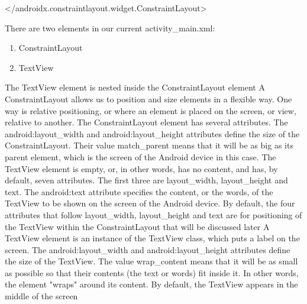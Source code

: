 \documentclass{report}
\begin{document}
\begin{itemize}
\begin{xmlcode}
                </androidx.constraintlayout.widget.ConstraintLayout>
            \end{xmlcode}
            \bigbreak \noindent 
            There are two elements in our current activity\_main.xml:
            \begin{enumerate}
                \item ConstraintLayout
                \item TextView
            \end{enumerate}
            \bigbreak \noindent 
            The TextView element is nested inside the ConstraintLayout element
            \bigbreak \noindent 
            A ConstraintLayout allows us to position and size elements in a flexible way.
            \bigbreak \noindent 
            One way is relative positioning, or where an element is placed on the screen, or view, relative to another. 
            \bigbreak \noindent 
            The ConstraintLayout element has several attributes.
            \bigbreak \noindent 
            The android:layout\_width and android:layout\_height attributes define the size of the ConstraintLayout.
            \bigbreak \noindent 
            Their value match\_parent means that it will be as big as its parent element, which is the screen of the Android device in this case.
            \bigbreak \noindent 
            The TextView element is empty, or, in other words, has no content, and has, by default, seven attributes.
            \bigbreak \noindent 
            The first three are layout\_width, layout\_height and text.
            \bigbreak \noindent 
            The android:text attribute specifies the content, or the words, of the TextView to be shown on the screen of the Android device.
            \bigbreak \noindent 
            By default, the four attributes that follow layout\_width, layout\_height and text are for positioning of the TextView within the ConstraintLayout that will be discussed later
            \bigbreak \noindent 
            A TextView element is an instance of the TextView class, which puts a label on the screen.
            \bigbreak \noindent 
            The android:layout\_width and android:layout\_height attributes define the size of the TextView.
            \bigbreak \noindent 
            The value wrap\_content means that it will be as small as possible so that their contents (the text or words) fit inside it.
            \bigbreak \noindent 
            In other words, the element "wraps" around its content.
            \bigbreak \noindent 
            By default, the TextView appears in the middle of the screen

\end{itemize}
\end{document}
